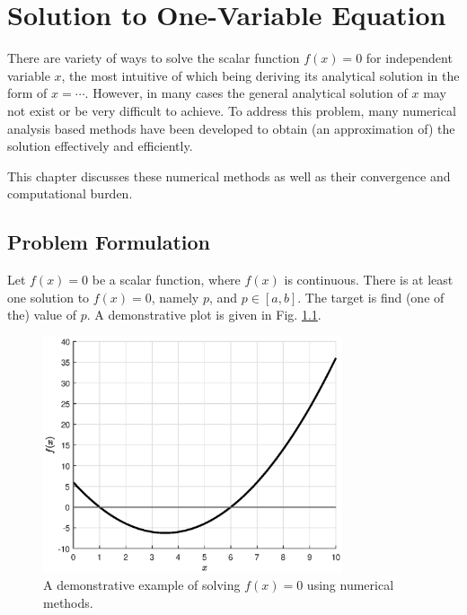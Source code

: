 \chapter{Solution to One-Variable Equation}

There are variety of ways to solve the scalar function $f(x)=0$ for independent variable $x$, the most intuitive of which being deriving its analytical solution in the form of $x=\cdots$. However, in many cases the general analytical solution of $x$ may not exist or be very difficult to achieve. To address this problem, many numerical analysis based methods have been developed to obtain (an approximation of) the solution effectively and efficiently.

This chapter discusses these numerical methods as well as their convergence and computational burden. 

\section{Problem Formulation}

Let $f(x)=0$ be a scalar function, where $f(x)$ is continuous. There is at least one solution to $f(x)=0$, namely $p$, and $p\in \left[a, b\right]$. The target is find (one of the) value of $p$. A demonstrative plot is given in Fig. \ref{fig:part-5:onevarproblemformulation}.

\begin{figure}[htbp]
\centering
\includegraphics[width=250pt]{chapters/part-5/figures/demo_problem_formulation.eps}
\caption{A demonstrative example of solving $f(x)=0$ using numerical methods.} \label{fig:part-5:onevarproblemformulation}
\end{figure} 